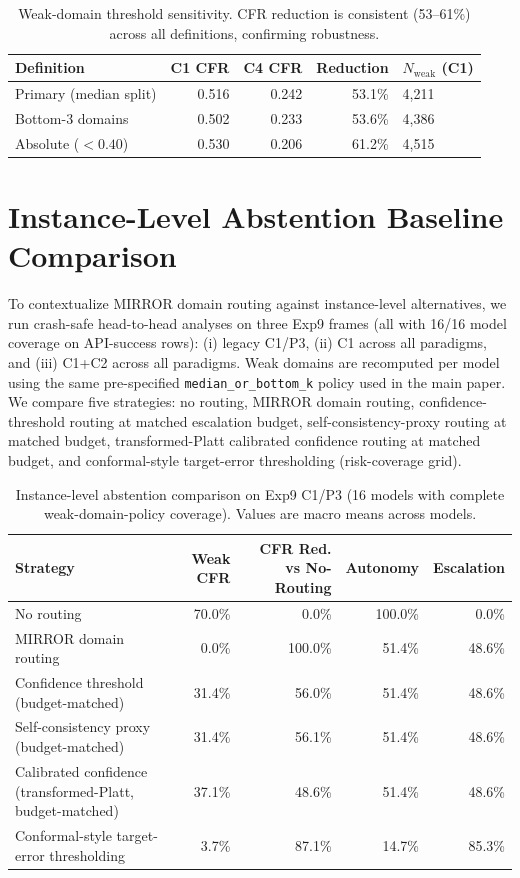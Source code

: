 \documentclass[10pt]{article}
\begin{document}
\begin{table}[h]
\centering
\caption{Weak-domain threshold sensitivity. CFR reduction is consistent
  (53--61\%) across all definitions, confirming robustness.}
\label{tab:threshold}
\small
\begin{tabular}{lrrrl}
\toprule
Definition & C1 CFR & C4 CFR & Reduction & $N_{\text{weak}}$ (C1) \\
\midrule
Primary (median split) & 0.516 & 0.242 & 53.1\% & 4{,}211 \\
Bottom-3 domains & 0.502 & 0.233 & 53.6\% & 4{,}386 \\
Absolute ($< 0.40$) & 0.530 & 0.206 & 61.2\% & 4{,}515 \\
\bottomrule
\end{tabular}
\end{table}

\section{Instance-Level Abstention Baseline Comparison}
\label{app:instance-baselines}

To contextualize MIRROR domain routing against instance-level alternatives, we
run crash-safe head-to-head analyses on three Exp9 frames (all with 16/16 model
coverage on API-success rows): (i) legacy C1/P3, (ii) C1 across all paradigms,
and (iii) C1+C2 across all paradigms. Weak domains are recomputed per model
using the same pre-specified \texttt{median\_or\_bottom\_k} policy used in the
main paper. We compare five strategies: no routing, MIRROR domain routing,
confidence-threshold routing at matched escalation budget, self-consistency-proxy
routing at matched budget, transformed-Platt calibrated confidence routing at
matched budget, and conformal-style target-error thresholding (risk-coverage grid).

\begin{table}[h]
\centering
\caption{Instance-level abstention comparison on Exp9 C1/P3 (16 models with complete weak-domain-policy coverage). Values are macro means across models.}
\label{tab:instance-baselines}
\small
\begin{tabular}{lrrrr}
\toprule
Strategy & Weak CFR & CFR Red. vs No-Routing & Autonomy & Escalation \\
\midrule
No routing & 70.0\% & 0.0\% & 100.0\% & 0.0\% \\
MIRROR domain routing & 0.0\% & 100.0\% & 51.4\% & 48.6\% \\
Confidence threshold (budget-matched) & 31.4\% & 56.0\% & 51.4\% & 48.6\% \\
Self-consistency proxy (budget-matched) & 31.4\% & 56.1\% & 51.4\% & 48.6\% \\
Calibrated confidence (transformed-Platt, budget-matched) & 37.1\% & 48.6\% & 51.4\% & 48.6\% \\
Conformal-style target-error thresholding & 3.7\% & 87.1\% & 14.7\% & 85.3\% \\
\bottomrule
\end{tabular}
\end{table}
\end{document}
